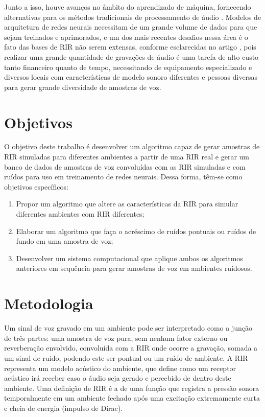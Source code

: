 Junto a isso, houve avanços no âmbito do aprendizado de máquina, fornecendo alternativas para os métodos tradicionais
de processamento de áudio \cite{ML_Speech_Rec}.
Modelos de arquitetura de redes neurais necessitam de um grande volume de dados para que sejam treinados e aprimorados, e um dos mais recentes
desafios nessa área é o fato das bases de RIR não serem extensas, conforme esclarecidas no artigo \cite{Estimation_RT_DRR},
pois realizar uma grande quantidade de gravações de áudio é uma tarefa de alto custo tanto financeiro quanto de tempo, necessitando de equipamento especializado
e diversos locais com características de modelo sonoro diferentes e pessoas diversas para gerar grande diversidade de amostras de voz.


\section{Objetivos}

O objetivo deste trabalho é desenvolver um algoritmo capaz de gerar amostras de RIR simuladas para diferentes ambientes a partir de uma RIR real e
gerar um banco de dados de amostras de voz convoluídas com as RIR simuladas e com ruídos para uso em treinamento de redes neurais.
Dessa forma, têm-se como objetivos específicos:

\begin{enumerate}
      \item Propor um algoritmo que altere as características da RIR para simular diferentes ambientes com RIR diferentes;
      \item Elaborar um algoritmo que faça o acréscimo de ruídos pontuais ou ruídos de fundo em uma amostra de voz;
      \item Desenvolver um sistema computacional que aplique ambos os algoritmos anteriores em sequência para gerar
      amostras de voz em ambientes ruidosos.
\end{enumerate}


\section{Metodologia}

Um sinal de voz gravado em um ambiente pode ser interpretado como a junção de três partes: uma amostra de voz pura, sem nenhum fator externo
ou reverberação envolvido, convoluída com a RIR onde ocorre a gravação, somada a um sinal de ruído, podendo este 
ser pontual ou um ruído de ambiente. A RIR representa um modelo acústico do ambiente, que define como um receptor acústico irá receber caso o áudio
seja gerado e percebido de dentro deste ambiente. Uma definição de RIR é a de uma função que registra a pressão sonora temporalmente
em um ambiente fechado após uma excitação extremamente curta e cheia de energia (impulso de Dirac).

